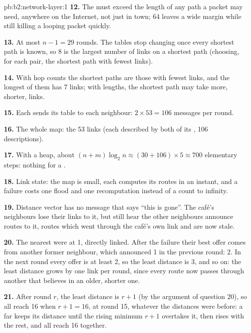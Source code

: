 \begin{solution}{pb:b2:network-layer:1}
\textbf{12.} The  must exceed the length of any path a packet may need, anywhere on the Internet, not just
in town; 64 leaves a wide margin while still killing a looping packet quickly.

\textbf{13.} At most $n - 1 = 29$ rounds. The tables stop changing once every shortest path is known, so 8 is the
largest number of links on a shortest path (choosing, for each pair, the shortest path with fewest links).

\textbf{14.} With hop counts the shortest paths are those with fewest links, and the longest of them has 7 links; with
lengths, the shortest path may take more, shorter, links.

\textbf{15.} Each  sends its table to each neighbour: $2 \times 53 = 106$ messages per round.

\textbf{16.} The whole map: the 53 links (each described by both of its , 106 descriptions).

\textbf{17.} With a heap, about $(n + m)\log_2 n \approx (30 + 106) \times 5 \approx 700$ elementary steps: nothing for
a .

\textbf{18.} Link state: the map is small, each  computes its routes in an instant, and a failure costs one
flood and one recomputation instead of a count to infinity.

\textbf{19.} Distance vector has no message that says ``this  is gone''. The café's neighbours lose their links
to it, but still hear the other neighbours announce routes to it, routes which went through the café's own link and
are now stale.

\textbf{20.} The nearest  were at 1, directly linked. After the failure their best offer comes from another
former neighbour, which announced 1 in the previous round: 2. In the next round every offer is at least 2, so the
least distance is 3, and so on: the least distance grows by one link per round, since every route now passes through
another  that believes in an older, shorter one.

\textbf{21.} After round $r$, the least distance is $r + 1$ (by the argument of question 20), so all reach 16 when $r
+ 1 = 16$, at round 15, whatever the distances were before: a far  keeps its distance until the rising minimum $r + 1$
overtakes it, then rises with the rest, and all reach 16 together.


\end{solution}
